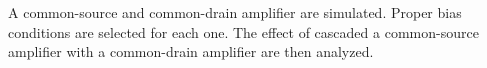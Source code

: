 A common-source and common-drain amplifier are simulated.
Proper bias conditions are selected for each one.
The effect of cascaded a common-source amplifier with a common-drain amplifier are then analyzed.

